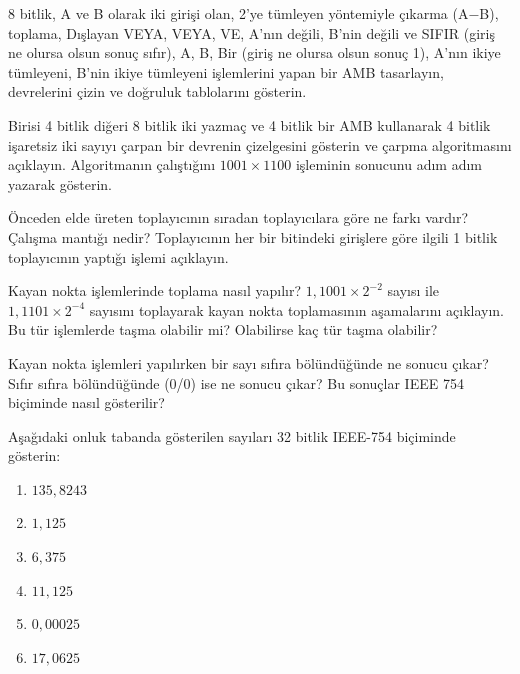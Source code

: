 \begin{alistirma}[\zor]
8 bitlik, A ve B olarak iki girişi olan, 2'ye tümleyen yöntemiyle çıkarma (A$-$B), toplama, Dışlayan VEYA, VEYA, VE, A'nın değili, B'nin değili ve SIFIR (giriş ne olursa olsun sonuç sıfır), A, B, Bir (giriş ne olursa olsun sonuç 1), A'nın ikiye tümleyeni, B'nin ikiye tümleyeni işlemlerini yapan bir AMB tasarlayın, devrelerini çizin ve doğruluk tablolarını gösterin.
\end{alistirma}

\begin{alistirma}[\zor]
Birisi 4 bitlik diğeri 8 bitlik iki yazmaç ve 4 bitlik bir AMB kullanarak 4 bitlik işaretsiz iki sayıyı çarpan bir devrenin çizelgesini gösterin ve çarpma algoritmasını açıklayın. Algoritmanın çalıştığını $1001 \times 1100$ işleminin sonucunu adım adım yazarak gösterin.
\end{alistirma}

\begin{alistirma}[\orta]
Önceden elde üreten toplayıcının sıradan toplayıcılara göre ne farkı vardır? Çalışma mantığı nedir? Toplayıcının her bir bitindeki girişlere göre ilgili 1 bitlik toplayıcının yaptığı işlemi açıklayın.
\end{alistirma}

\begin{alistirma}[\orta]
Kayan nokta işlemlerinde toplama nasıl yapılır? $1{,}1001 \times 2^{-2}$ sayısı ile $1{,}1101 \times 2^{-4}$ sayısını toplayarak kayan nokta toplamasının aşamalarını açıklayın. Bu tür işlemlerde taşma olabilir mi? Olabilirse kaç tür taşma olabilir?
\end{alistirma}

\begin{alistirma}[\kolay]
Kayan nokta işlemleri yapılırken bir sayı sıfıra bölündüğünde ne sonucu çıkar? Sıfır sıfıra bölündüğünde (0/0) ise ne sonucu çıkar? Bu sonuçlar IEEE 754 biçiminde nasıl gösterilir?
\end{alistirma}

\begin{alistirma}[\orta]
Aşağıdaki onluk tabanda gösterilen sayıları 32 bitlik IEEE-754 biçiminde gösterin:
\begin{enumerate}
\item $135{,}8243$
\item $1{,}125$
\item $6{,}375$
\item $11{,}125$
\item $0{,}00025$
\item $17{,}0625$
\end{enumerate}
\end{alistirma}

